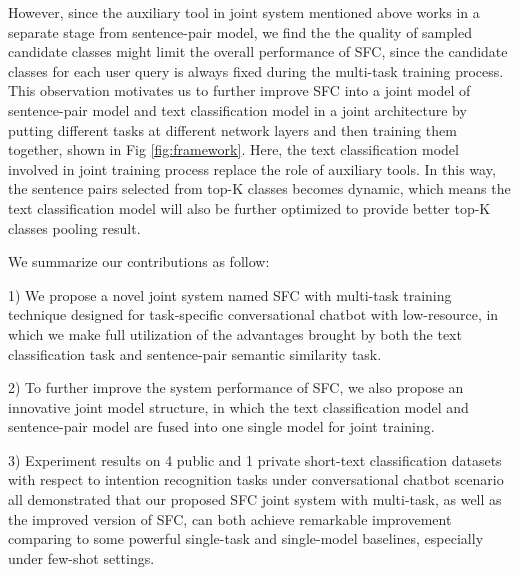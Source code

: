 \documentclass[letterpaper]{article} %
\begin{document}
  However,  since  the auxiliary tool in joint system mentioned above works in a
  separate  stage  from  sentence-pair model, we find the the quality of sampled
  candidate  classes  might  limit  the  overall  performance  of SFC, since the
  candidate  classes  for  each user query is always fixed during the multi-task
  training  process. This observation motivates us to further improve SFC into a
  joint  model  of  sentence-pair  model  and  text  classification  model  in a
  joint  architecture  by  putting  different  tasks at different network
  layers \cite{sogaard2016deep,   hashimoto2016joint}   and  then  training  them
  together,  shown  in  Fig  \ref{fig:framework}.  Here, the text classification
  model  involved in joint training process replace the role of auxiliary tools.
  In  this  way, the sentence pairs selected from top-K classes becomes dynamic,
  which  means  the  text classification model will also be further optimized to
  provide better top-K classes pooling result.

  We summarize our contributions as follow:

  1)  We  propose  a  novel  joint  system  named  SFC  with multi-task training
  technique designed for task-specific conversational chatbot with low-resource,
  in  which  we make full utilization of the advantages brought by both the text
  classification task and sentence-pair semantic similarity task.

  2)  To  further  improve  the  system  performance  of SFC, we also propose an
  innovative  joint  model structure, in which the text classification model and
  sentence-pair model are fused into one single model for joint training.

  3)  Experiment  results  on  4  public and 1 private short-text classification
  datasets with respect to intention recognition tasks under conversational chatbot
  scenario  all demonstrated that our proposed SFC joint system with multi-task,
  as  well  as  the  improved  version  of  SFC,  can  both  achieve  remarkable
  improvement comparing to some powerful single-task and single-model baselines,
  especially under few-shot settings.
\end{document}
